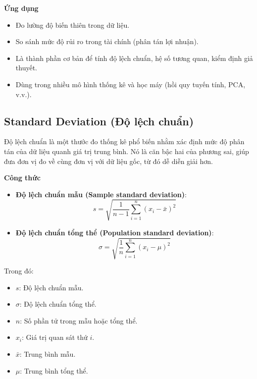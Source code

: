 \textbf{Ứng dụng}

\begin{itemize}
    \item Đo lường độ biến thiên trong dữ liệu.
    \item So sánh mức độ rủi ro trong tài chính (phân tán lợi nhuận).
    \item Là thành phần cơ bản để tính độ lệch chuẩn, hệ số tương quan, kiểm định giả thuyết.
    \item Dùng trong nhiều mô hình thống kê và học máy (hồi quy tuyến tính, PCA, v.v.).
\end{itemize}

\subsection {Standard Deviation (Độ lệch chuẩn)}
\label{stat:sd}

Độ lệch chuẩn là một thước đo thống kê phổ biến nhằm xác định mức độ phân tán của dữ liệu quanh giá trị trung bình. Nó là căn bậc hai của phương sai, giúp đưa đơn vị đo về cùng đơn vị với dữ liệu gốc, từ đó dễ diễn giải hơn.

\textbf{Công thức}

\begin{itemize}
    \item \textbf{Độ lệch chuẩn mẫu (Sample standard deviation)}:
    \begin{equation}
        s = \sqrt{\frac{1}{n - 1} \sum_{i=1}^{n} (x_i - \bar{x})^2}
        \label{eq:sample-sd}
    \end{equation}

    \item \textbf{Độ lệch chuẩn tổng thể (Population standard deviation)}:
    \begin{equation}
        \sigma = \sqrt{\frac{1}{n} \sum_{i=1}^{n} (x_i - \mu)^2}
        \label{eq:population-sd}
    \end{equation}
\end{itemize}

\noindent
Trong đó:
\begin{itemize}
    \item \( s \): Độ lệch chuẩn mẫu.
    \item \( \sigma \): Độ lệch chuẩn tổng thể.
    \item \( n \): Số phần tử trong mẫu hoặc tổng thể.
    \item \( x_i \): Giá trị quan sát thứ \( i \).
    \item \( \bar{x} \): Trung bình mẫu.
    \item \( \mu \): Trung bình tổng thể.
\end{itemize}

